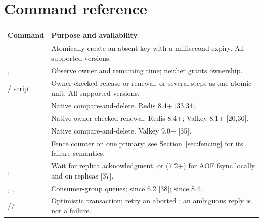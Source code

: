 \section{Command reference}
\begin{longtable}{L{.36\linewidth}L{.56\linewidth}}\toprule Command & Purpose and availability \\ \midrule\endhead
{} & Atomically create an absent key with a millisecond expiry. All supported versions. \\
,  & Observe owner and remaining time; neither grants ownership. \\
 /  script & Owner-checked release or renewal, or several steps as one atomic unit. All supported versions. \\
 & Native compare-and-delete. Redis 8.4+ [33,34]. \\
 & Native owner-checked renewal. Redis 8.4+; Valkey 8.1+ [20,36]. \\
 & Native compare-and-delete. Valkey 9.0+ [35]. \\
 & Fence counter on one primary; see Section~\ref{sec:fencing} for its failure semantics. \\
,  & Wait for replica acknowledgment, or (7.2+) for AOF fsync locally and on replicas [37]. \\
, ,  & Consumer-group queues;  since 6.2 [38];  since 8.4. \\
// & Optimistic transaction; retry an aborted ; an ambiguous reply is not a failure. \\
\bottomrule\end{longtable}

